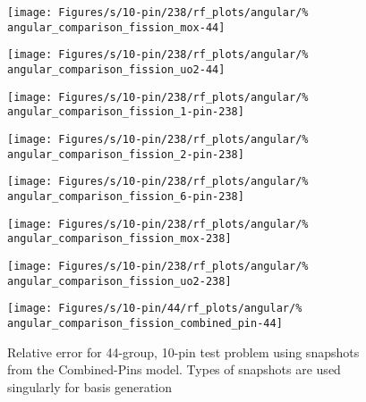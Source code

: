 \begin{figure*}[tbph]
    \centering
    \texttt{[image: Figures/s/10-pin/238/rf\_plots/angular/\%
        angular\_comparison\_fission\_mox-44]}
\end{figure*}

\begin{figure*}[tbph]
    \centering
    \texttt{[image: Figures/s/10-pin/238/rf\_plots/angular/\%
        angular\_comparison\_fission\_uo2-44]}
\end{figure*}

\clearpage

\begin{figure*}[tbph]
    \centering
    \texttt{[image: Figures/s/10-pin/238/rf\_plots/angular/\%
        angular\_comparison\_fission\_1-pin-238]}
\end{figure*}

\begin{figure*}[tbph]
    \centering
    \texttt{[image: Figures/s/10-pin/238/rf\_plots/angular/\%
        angular\_comparison\_fission\_2-pin-238]}
\end{figure*}

\begin{figure*}[tbph]
    \centering
    \texttt{[image: Figures/s/10-pin/238/rf\_plots/angular/\%
        angular\_comparison\_fission\_6-pin-238]}
\end{figure*}

\begin{figure*}[tbph]
    \centering
    \texttt{[image: Figures/s/10-pin/238/rf\_plots/angular/\%
        angular\_comparison\_fission\_mox-238]}
\end{figure*}

\begin{figure*}[tbph]
    \centering
    \texttt{[image: Figures/s/10-pin/238/rf\_plots/angular/\%
        angular\_comparison\_fission\_uo2-238]}
\end{figure*}

\begin{figure*}[tb]
    \centering
    \texttt{[image: Figures/s/10-pin/44/rf\_plots/angular/\%
        angular\_comparison\_fission\_combined\_pin-44]}
    \caption{Relative error for 44-group, 10-pin test problem using 
        snapshots from the Combined-Pins model.  Types of snapshots are used 
        singularly for basis generation}
    \label{fig:10-pin_combined-pin-single}
\end{figure*}

